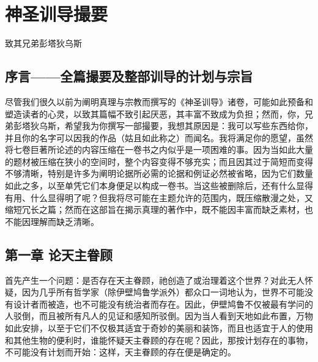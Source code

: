 
\chapter{神圣训导撮要}


致其兄弟彭塔狄乌斯\par


\section{序言——全篇撮要及整部训导的计划与宗旨}

尽管我们很久以前为阐明真理与宗教而撰写的《神圣训导》诸卷，可能如此预备和塑造读者的心灵，以致其篇幅不致引起厌恶，其丰富不致成为负担；然而，你，兄弟彭塔狄乌斯，希望我为你撰写一部撮要，我想其原因是：我可以写些东西给你，并且你的名字可以因我的作品（姑且如此称之）而闻名。我将满足你的愿望，虽然将七卷巨著所论述的内容压缩在一卷书之内似乎是一项困难的事。因为当如此大量的题材被压缩在狭小的空间时，整个内容变得不够充实；而且因其过于简短而变得不够清晰，特别是许多为阐明论据所必需的论据和例证必然被省略，因为它们数量如此之多，以至单凭它们本身便足以构成一卷书。当这些被删除后，还有什么显得有用、什么显得明了呢？但我将尽可能在主题允许的范围内，既压缩散漫之处，又缩短冗长之篇；然而在这部旨在揭示真理的著作中，既不能因丰富而缺乏素材，也不能因理解而缺乏清晰。\par


\section{第一章 论天主眷顾}

首先产生一个问题：是否存在天主眷顾，祂创造了或治理着这个世界？对此无人怀疑，因为几乎所有哲学家（除伊壁鸠鲁学派外）都众口一词地认为，世界不可能没有设计者而被造，也不可能没有统治者而存在。因此，伊壁鸠鲁不仅被最有学问的人驳倒，而且被所有凡人的见证和感知所驳倒。因为当人看到天地如此布置，万物如此安排，以至于它们不仅极其适宜于奇妙的美丽和装饰，而且也适宜于人的使用和其他生物的便利时，谁能怀疑天主眷顾的存在呢？因此，那按计划存在的事物，不可能没有计划而开始：这样，天主眷顾的存在便是确定的。\par

